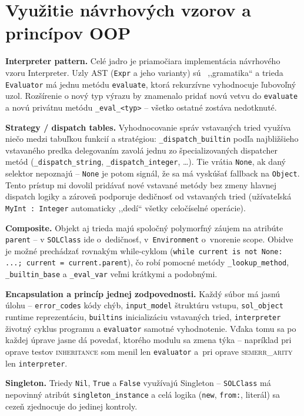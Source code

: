\documentclass[a4paper, 11pt]{article}
\begin{document}
\section{Využitie návrhových vzorov a princípov OOP}

\textbf{Interpreter pattern.} Celé jadro je priamočiara implementácia
návrhového vzoru Interpreter. Uzly AST (\texttt{Expr} a jeho varianty) sú
~,,gramatika`` a trieda \texttt{Evaluator} má jednu metódu \texttt{evaluate},
ktorá rekurzívne vyhodnocuje ľubovoľný uzol. Rozšírenie o nový typ výrazu by
znamenalo pridať novú vetvu do \texttt{evaluate} a novú privátnu metódu
\texttt{\_eval\_<typ>} -- všetko ostatné zostáva nedotknuté.

\textbf{Strategy / dispatch tables.} Vyhodnocovanie správ vstavaných tried
využíva niečo medzi tabuľkou funkcií a stratégiou: \texttt{\_dispatch\_builtin}
podľa najbližšieho vstavaného predka delegovaním zavolá jednu zo špecializovaných
dispatcher metód (\texttt{\_dispatch\_string}, \texttt{\_dispatch\_integer},
\ldots). Tie vrátia \texttt{None}, ak daný selektor nepoznajú -- \texttt{None}
je potom signál, že sa má vyskúšať fallback na \texttt{Object}. Tento prístup
mi dovolil pridávať nové vstavané metódy bez zmeny hlavnej dispatch logiky
a zároveň podporuje dedičnosť od vstavaných tried (užívateľská \texttt{MyInt
: Integer} automaticky ,,dedí`` všetky celočíselné operácie).

\textbf{Composite.} Objekt aj trieda majú spoločný polymorfný záujem na
atribúte \texttt{parent} -- v \texttt{SOLClass} ide o~dedičnosť,
v~\texttt{Environment} o~vnorenie scope. Obidve je možné prechádzať rovnakým
while-cyklom (\texttt{while current is not None: ...; current = current.parent}),
čo robí pomocné metódy \texttt{\_lookup\_method}, \texttt{\_builtin\_base}
a \texttt{\_eval\_var} veľmi krátkymi a podobnými.

\textbf{Encapsulation a princíp jednej zodpovednosti.} Každý súbor má jasnú
úlohu -- \texttt{error\_codes} kódy chýb, \texttt{input\_model} štruktúru
vstupu, \texttt{sol\_object} runtime reprezentáciu, \texttt{builtins}
inicializáciu vstavaných tried, \texttt{interpreter} životný cyklus programu
a \texttt{evaluator} samotné vyhodnotenie. Vďaka tomu sa po každej úprave
jasne dá povedať, ktorého modulu sa zmena týka -- napríklad pri oprave
testov \textsc{inheritance} som menil len \texttt{evaluator} a~pri oprave
\textsc{semerr\_arity} len \texttt{interpreter}.

\textbf{Singleton.} Triedy \texttt{Nil}, \texttt{True} a \texttt{False}
využívajú Singleton -- \texttt{SOLClass} má nepovinný atribút
\texttt{singleton\_instance} a celá logika (\texttt{new}, \texttt{from:},
literál) sa cezeň zjednocuje do jedinej kontroly.
\end{document}
